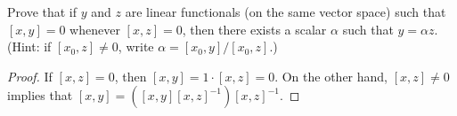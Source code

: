 \documentclass[12pt]{article}
\newenvironment{problem}[2][Problem]{\begin{trivlist} \item[\hskip \labelsep {\bfseries #1}\hskip \labelsep {\bfseries #2.}]}{\end{trivlist}}
\begin{document}
\begin{problem}{6}
  Prove that if $y$ and $z$ are linear functionals (on the same vector space) such that $[x,y]=0$ whenever $[x,z]=0$, then there exists a scalar $\alpha$ such that $y=\alpha z$. (Hint: if $[x_{0}, z] \neq 0$, write $\alpha = [x_{0}, y]/[x_{0},z]$.)
\begin{proof}
  If $[x,z]=0$, then $[x,y]=1\cdot [x,z]=0$. On the other hand, $[x,z]\neq 0$ implies that $[x,y] = \left( [x,y][x,z]^{-1} \right)[x,z]^{-1}$. 
\end{proof}
\end{problem}
\end{document}
